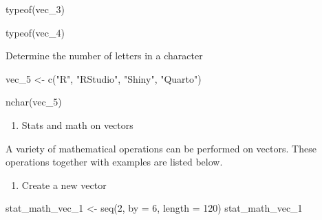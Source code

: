 \documentclass[
  letterpaper,
  DIV=11,
  numbers=noendperiod]{scrreprt}
\newenvironment{Shaded}{}{}
\newcommand{\AttributeTok}[1]{\textcolor[rgb]{0.84,0.23,0.29}{#1}}
\newcommand{\DecValTok}[1]{\textcolor[rgb]{0.00,0.36,0.77}{#1}}
\newcommand{\FunctionTok}[1]{\textcolor[rgb]{0.44,0.26,0.76}{#1}}
\newcommand{\NormalTok}[1]{\textcolor[rgb]{0.14,0.16,0.18}{#1}}
\newcommand{\OtherTok}[1]{\textcolor[rgb]{0.44,0.26,0.76}{#1}}
\newcommand{\StringTok}[1]{\textcolor[rgb]{0.01,0.18,0.38}{#1}}
\providecommand{\tightlist}{%
  \setlength{\itemsep}{0pt}\setlength{\parskip}{0pt}}\usepackage{longtable,booktabs,array}
\begin{document}
\begin{Shaded}
\begin{Highlighting}[]
\FunctionTok{typeof}\NormalTok{(vec\_3)}
\end{Highlighting}
\end{Shaded}

\begin{Shaded}
\begin{Highlighting}[]
\FunctionTok{typeof}\NormalTok{(vec\_4)}
\end{Highlighting}
\end{Shaded}

Determine the number of letters in a character

\begin{Shaded}
\begin{Highlighting}[]
\NormalTok{vec\_5 }\OtherTok{\textless{}{-}} \FunctionTok{c}\NormalTok{(}\StringTok{"R"}\NormalTok{, }\StringTok{"RStudio"}\NormalTok{, }\StringTok{"Shiny"}\NormalTok{, }\StringTok{"Quarto"}\NormalTok{)}
\end{Highlighting}
\end{Shaded}

\begin{Shaded}
\begin{Highlighting}[]
\FunctionTok{nchar}\NormalTok{(vec\_5)}
\end{Highlighting}
\end{Shaded}

\begin{enumerate}
\def\labelenumi{\arabic{enumi}.}
\setcounter{enumi}{2}
\tightlist
\item
  Stats and math on vectors
\end{enumerate}

A variety of mathematical operations can be performed on vectors. These
operations together with examples are listed below.

\begin{enumerate}
\def\labelenumi{\alph{enumi}.}
\tightlist
\item
  Create a new vector
\end{enumerate}

\begin{Shaded}
\begin{Highlighting}[]
\NormalTok{stat\_math\_vec\_1 }\OtherTok{\textless{}{-}} \FunctionTok{seq}\NormalTok{(}\DecValTok{2}\NormalTok{, }\AttributeTok{by =} \DecValTok{6}\NormalTok{, }\AttributeTok{length =} \DecValTok{120}\NormalTok{)}
\NormalTok{stat\_math\_vec\_1}
\end{Highlighting}
\end{Shaded}
\end{document}
